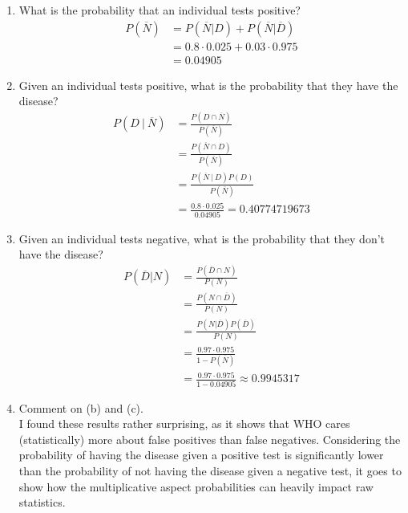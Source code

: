 \documentclass{article}
\begin{document}
\begin{enumerate}[label=\alph*)]
    \item What is the probability that an individual tests positive?
          \begin{align*}
              P(\overline{N}) & = P(\overline{N} | D) + P(\overline{N} | \overline{D}) \\
                              & = 0.8 \cdot 0.025 + 0.03 \cdot 0.975                   \\
                              & = 0.04905
          \end{align*}
    \item Given an individual tests positive, what is the probability that they have the disease?
          \begin{align*}
              P(D\ \vert\ \overline{N}) & = \frac{P(D \cap \overline{N})}{P(\overline{N})}         \\
                                        & = \frac{P(\overline{N} \cap D)}{P(\overline{N})}         \\
                                        & = \frac{P(\overline{N}\ \vert\ D) P(D)}{P(\overline{N})} \\
                                        & = \frac{0.8 \cdot 0.025}{0.04905} = 0.40774719673
          \end{align*}
    \item Given an individual tests negative, what is the probability that they don't have the disease?
          \begin{align*}
              P(\overline{D} \vert N) & = \frac{P(\overline{D} \cap N)}{P(N)}                    \\
                                      & = \frac{P(N \cap \overline{D})}{P(N)}                    \\
                                      & = \frac{P(N \vert \overline{D}) P(\overline{D})}{P(N)}   \\
                                      & = \frac{0.97 \cdot 0.975}{1 - P(\overline{N})}           \\
                                      & = \frac{0.97 \cdot 0.975}{1 - 0.04905} \approx 0.9945317
          \end{align*}
    \item Comment on (b) and (c). \\
          I found these results rather surprising, as it shows that WHO cares (statistically) more about false positives than false negatives. Considering the probability of having the disease given a positive test is significantly lower than the probability of not having the disease given a negative test, it goes to show how the multiplicative aspect probabilities can heavily impact raw statistics.
\end{enumerate}
\end{document}
